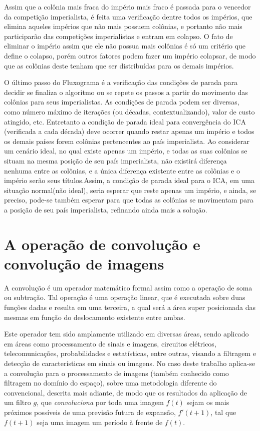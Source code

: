 Assim que a colônia mais fraca do império mais fraco é passada para o vencedor da competição imperialista, é feita uma verificação dentre todos os impérios, que elimina aqueles impérios que não mais possuem colônias, e portanto não mais participarão das competições imperialistas e entram em colapso. O fato de eliminar o império assim que ele não possua mais colônias é só um critério que define o colapso, porém outros fatores podem fazer um império colapsar, de modo que as colônias deste tenham que ser distribuídas para os demais impérios.

O último passo do Fluxograma é a verificação das condições de parada para decidir se finaliza o algoritmo ou se repete os passos a partir do movimento das colônias para seus imperialistas. As condições de parada podem ser diversas, como número máximo de iterações (ou décadas, contextualizando), valor de custo atingido, etc. Entretanto a condição de parada ideal para convergência do ICA (verificada a cada década) deve ocorrer quando restar apenas um império e todos os demais países forem colônias pertencentes ao país imperialista. Ao considerar um cenário ideal, no qual existe apenas um império, e todas as suas colônias se situam na mesma posição de seu país imperialista, não existirá diferença nenhuma entre as colônias, e a única diferença existente entre as colônias e o império serão seus títulos.Assim, a condição de parada ideal para o ICA, em uma situação normal(não ideal), seria esperar que reste apenas um império, e ainda, se preciso, pode-se também esperar para que todas as colônias se movimentam para a posição de seu país imperialista, refinando ainda mais a solução.










\section{A operação de convolução e convolução de imagens}
   
A convolução é um operador matemático formal assim como a operação de soma ou subtração. Tal operação é uma operação linear, que é executada sobre duas funções dadas e resulta em uma terceira, a qual será a área super posicionada das mesmas em função do deslocamento existente entre ambas.

Este operador tem sido amplamente utilizado em diversas áreas, sendo aplicado em áreas como processamento de sinais e imagens, circuitos elétricos, telecomunicações, probabilidades e estatísticas, entre outras, visando a filtragem e detecção de características em sinais ou imagens. No caso deste trabalho aplica-se a convolução para o processamento de imagens (também conhecido como filtragem no domínio do espaço), sobre uma metodologia diferente do convencional, descrita mais adiante, de modo que os resultados da aplicação de um filtro \(g\), que \emph{convoluciona} por toda uma imagem \(f(t)\) sejam os mais próximos possíveis de uma previsão futura de expansão, \(f'(t+1)\), tal que \(f(t+1)\) seja uma imagem um período à frente de \(f(t)\).

